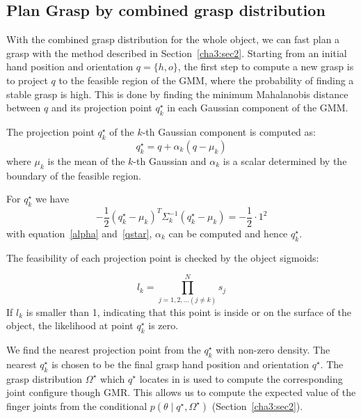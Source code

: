 \subsection{Plan Grasp by combined grasp distribution}
\label{cha3:sec4:plan}

With the combined grasp distribution for the whole object, we can fast plan a grasp with the method described in Section~\ref{cha3:sec2}. Starting from an initial hand position and orientation $q = \{h, o\}$, the first step to compute a new grasp is to project $q$ to the feasible region of the GMM, where the probability of finding a stable grasp is high. This is done by finding the minimum Mahalanobis distance between $q$ and its projection point $q_k^\star$ in each Gaussian component of the GMM.

The projection point $q_k^{\star}$ of the $k$-th Gaussian component is computed as:
\begin{equation} \label{alpha}
q_k^{\star} = q + \alpha_k\left(q-\mu_k\right)
\end{equation}
where $\mu_k$ is the mean of the $k$-th Gaussian and $\alpha_k$ is a scalar determined by the boundary of the feasible region.

For $q_k^{\star}$ we have
\begin{equation} \label{qstar}
-\frac{1}{2}\left(q_k^{\star}-\mu_k\right)^T\Sigma_k^{-1}\left(q_k^\star-\mu_k\right)=-\frac{1}{2}\cdot{1}^{2}
\end{equation}
with equation~\ref{alpha} and~\ref{qstar}, $\alpha_k$ can be computed and hence $q_k^{\star}$.

The feasibility of each projection point is checked by the object sigmoids:

\begin{equation}
l_k = \prod_{j=1,2,...\left(j\neq{k}\right)}^N{s_j}
\end{equation}
If $l_k$ is smaller than 1, indicating that this point is inside or on the surface of the object, the likelihood at point $q^{\star}_k$ is zero.

We find the nearest projection point from the $q_k^\star$ with non-zero density. The nearest $q_k^\star$ is chosen to be the final grasp hand position and orientation $q^\star$. The grasp distribution $\Omega^{\star}$ which $q^{\star}$ locates in is used to compute the corresponding joint configure though GMR. This allows us to compute the expected value of the finger joints from the conditional $p\left(\theta\mid{q^{\star}},\Omega^{\star}\right)$ (Section~\ref{cha3:sec2}). 